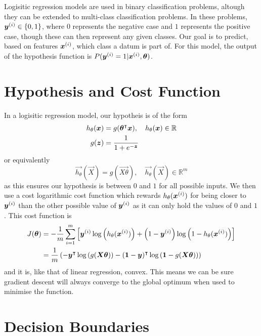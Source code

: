 Logisitic regression models are used in binary classification problems, altough they can be extended to multi-class classification problems.
In these problems, $\bm{y}^{(i)} \in \{0, 1\}$, where $0$ represents the negative case and $1$ represents the positive case, though these can then
represent any given classes. Our goal is to predict, based on features $\bm{x}^{(i)}$, which class a datum is part of. For this model, the output of
the hypothesis function is $P(\bm{y}^{(i)} = 1 | \bm{x}^{(i)}, \bm{\theta})$.

\section{Hypothesis and Cost Function}

In a logisitic regression model, our hypotheis is of the form
\begin{align}
    h_{\theta}(\bm{x}) &= g(\bm{\theta}^{\intercal}\bm{x}), \quad  h_{\theta}(\bm{x}) \in \mathbb{R} \\
    g(\bm{z}) &= \frac{1}{1 + e^{-\bm{z}}}
\end{align}
or equivalently
\begin{equation}
    \vec{h_{\theta}}(\vec{X}) = g(\vec{X\theta}), \quad \vec{h_{\theta}}(\vec{X}) \in \mathbb{R}^{m}
\end{equation}
as this ensures our hypothesis is between $0$ and $1$ for all possible inputs. We then use a cost logarithmic cost function
which rewards $h_{\theta}(\bm{x}^{(i)})$ for being closer to $\bm{y}^{(i)}$ than the other possible value of $\bm{y}^{(i)}$ as
it can only hold the values of $0$ and $1$. This cost function is
\begin{align}
    J(\bm{\theta}) &= -\frac{1}{m}\sum_{i=1}^{m}\left[\bm{y}^{(i)}\log{\left(h_{\theta}(\bm{x}^{(i)})\right)} + \left(1-\bm{y}^{(i)}\right)\log{\left(1-h_{\theta}(\bm{x}^{(i)})\right)}\right] \\
    &= \frac{1}{m} \left(-\bm{y}^{\intercal}\log{\left(g(\bm{X\theta})\right)} - (\bm{1} - \bm{y})^{\intercal}\log{\left(\bm{1} - g(\bm{X\theta})\right)}\right)
\end{align}
and it is, like that of linear regression, convex. This means we can be sure gradient descent will always converge to the global optimum when used to minimise
the function.

\section{Decision Boundaries}

